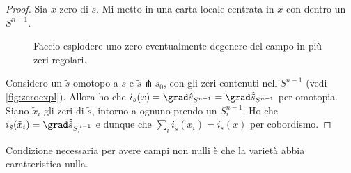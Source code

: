 \begin{proof}
	Sia $x$ zero di $s$.
	Mi metto in una carta locale centrata in $x$ con dentro un $S^{n-1}$.
	\begin{figure}
		\centering
		
		\caption{Faccio esplodere uno zero eventualmente degenere del campo in più zeri regolari.}
		\label{fig:zeroexpl}
	\end{figure}
	Considero un $\tilde s$ omotopo a $s$ e $\tilde s\pitchfork s_0$, con gli zeri contenuti nell'$S^{n-1}$ (vedi \autoref{fig:zeroexpl}).
	Allora ho che $i_s(x)=\grad\hat s_{S^{n-1}}=\grad\hat{\tilde s}_{S^{n-1}}$ per omotopia.
	Siano $\tilde x_i$ gli zeri di $\tilde s$, intorno a ognuno prendo un $S_i^{n-1}$.
	Ho che $i_{\tilde s}(\tilde x_i)=\grad\hat{\tilde s}_{S_i^{n-1}}$ e dunque che $\sum_ii_{\tilde s}(\tilde x_i)=i_s(x)$ per cobordismo.
\end{proof}

\begin{oss}
	Condizione necessaria per avere campi non nulli è che la varietà abbia caratteristica nulla.
\end{oss}
